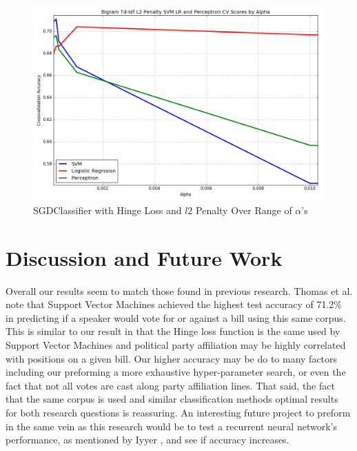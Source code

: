 \documentclass[a4paper, 12pt]{article}
\begin{document}
\begin{figure}[!ht]
\centering
\includegraphics[width=0.5\linewidth]{ZoomedL2NormSVM.png}
\caption[SGDClassifier with Hinge Loss and $l2$ Penalty Over a Range of $\alpha$ ]{SGDClassifier with Hinge Loss and $l2$ Penalty Over Range of $\alpha$'s}
\label{fig: sgd}
\end{figure}

\section{Discussion and Future Work}
Overall our results seem to match those found in previous research. Thomas et al. note \cite{thomas2006get} that Support Vector Machines achieved the highest test accuracy of 71.2\% in predicting if a speaker would vote for or against a bill using this same corpus. This is similar to our result in that the Hinge loss function is the same used by Support Vector Machines and political party affiliation may be highly correlated with positions on a given bill.  Our higher accuracy may be do to many factors including our preforming a more exhaustive hyper-parameter search, or even the fact that not all votes are cast along party affiliation lines. That said, the fact that the same corpus is used and similar classification methods optimal results for both research questions is reassuring. An interesting future project to preform in the same vein as this research would be to test a recurrent neural network's performance, as mentioned by Iyyer \cite{iyyer2014political}, and see if accuracy increases. 
\newpage


\end{document}
